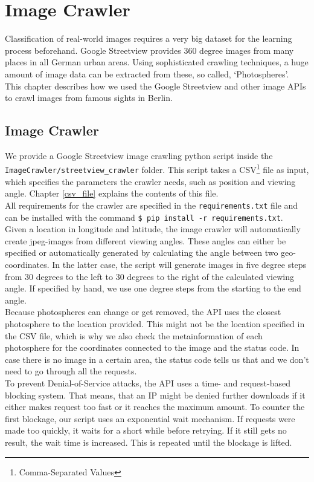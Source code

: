 \section{Image Crawler}
Classification of real-world images requires a very big dataset for the learning process beforehand. Google Streetview provides 360 degree images from many places in all German urban areas. Using sophisticated crawling techniques, a huge amount of image data can be extracted from these, so called, `Photospheres'.\\
This chapter describes how we used the Google Streetview and other image APIs to crawl images from famous sights in Berlin.

\subsection{Image Crawler}
We provide a Google Streetview image crawling python script inside the\\\texttt{ImageCrawler/streetview\_crawler} folder. This script takes a CSV\footnote{Comma-Separated Values} file as input, which specifies the parameters the crawler needs, such as position and viewing angle. Chapter \ref{csv_file} explains the contents of this file.\\
All requirements for the crawler are specified in the \texttt{requirements.txt} file and can be installed with the command \texttt{\$ pip install -r requirements.txt}.\\
Given a location in longitude and latitude, the image crawler will automatically create jpeg-images from different viewing angles. These angles can either be specified or automatically generated by calculating the angle between two geo-coordinates. In the latter case, the script will generate images in five degree steps from 30 degrees to the left to 30 degrees to the right of the calculated viewing angle. If specified by hand, we use one degree steps from the starting to the end angle.\\
Because photospheres can change or get removed, the API uses the closest photosphere to the location provided. This might not be the location specified in the CSV file, which is why we also check the metainformation of each photosphere for the coordinates connected to the image and the status code. In case there is no image in a certain area, the status code tells us that and we don't need to go through all the requests.\\
To prevent Denial-of-Service attacks, the API uses a time- and request-based blocking system. That means, that an IP might be denied further downloads if it either makes request too fast or it reaches the maximum amount. To counter the first blockage, our script uses an exponential wait mechanism. If requests were made too quickly, it waits for a short while before retrying. If it still gets no result, the wait time is increased. This is repeated until the blockage is lifted.\\
